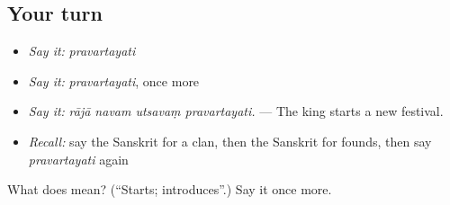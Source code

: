 \subsection*{Your turn}
\begin{itemize}
\raggedright
  \item \emph{Say it:} \emph{pravartayati}
  \item \emph{Say it:} \emph{pravartayati}, once more
  \item \emph{Say it:} \emph{rājā navam utsavaṃ pravartayati.} — The king starts a new festival.
  \item \emph{Recall:} say the Sanskrit for a clan, then the Sanskrit for founds, then say \emph{pravartayati} again
\end{itemize}

\begin{tcolorbox}[breakable,colback=teal!4,colframe=teal!35!black,title={Before you move on}]
What does  mean? (\textquotedblleft{}Starts; introduces\textquotedblright{}.) Say it once more.
\end{tcolorbox}
